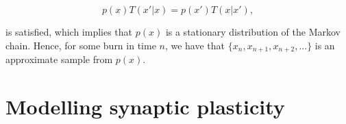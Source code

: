 \begin{equation}
    p(x)T(x'|x) = p(x')T(x|x'),
\end{equation} 

is satisfied, which implies that $p(x)$ is a stationary distribution of the Markov chain. Hence, for some burn in time $n$, we have that $\{x_n, x_{n+1}, x_{n+2},...\}$ is an approximate sample from $p(x)$.








\section{Modelling synaptic plasticity}
\label{sec:SP}

